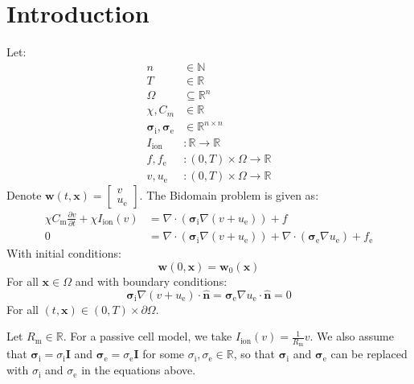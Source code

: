 \documentclass{article}
\newcommand{\bvec}[1]{\boldsymbol{#1}}
\newcommand{\brvec}[1]{\mathbf{#1}}
\newcommand{\bmat}[1]{\boldsymbol{#1}}
\newcommand{\brmat}[1]{\mathbf{#1}}
\begin{document}
\section{Introduction}

Let:
\begin{align*}
    n & \in \mathbb{N} \\
    T & \in \mathbb{R} \\
    \Omega & \subseteq \mathbb{R}^n \\
    \chi, C_m & \in \mathbb{R} \\
    \bmat{\sigma}_\text{i}, \bmat{\sigma}_\text{e} & \in \mathbb{R}^{n \times n} \\
    I_\text{ion} & : \mathbb{R} \rightarrow \mathbb{R} \\
    f, f_\text{e} & : (0, T) \times \Omega \rightarrow \mathbb{R} \\
    v, u_\text{e} & : (0, T) \times \Omega \rightarrow \mathbb{R}
\end{align*}
Denote $\bvec{w}(t, \bvec{x}) = \begin{bmatrix}
    v \\
    u_\text{e}
\end{bmatrix}$. The Bidomain problem is given as:
\begin{align} \label{eq1}
    \chi C_\text{m} \frac{\partial v}{\partial t}
        + \chi I_\text{ion}(v)
        & = \nabla \cdot (\bmat{\sigma}_\text{i} \nabla (v + u_\text{e}))
        + f \\
    \label{eq2}
    0
        & = \nabla \cdot (\bmat{\sigma}_\text{i} \nabla (v + u_\text{e}))
        + \nabla \cdot (\bmat{\sigma}_\text{e} \nabla u_\text{e})
        + f_\text{e}
\end{align}
\noindent With initial conditions:
\begin{equation}
    \bvec{w}(0, \bvec{x}) = \bvec{w}_0(\bvec{x})
\end{equation}
\noindent For all $\bvec{x} \in \Omega$ and with boundary conditions:
\begin{equation} \label{BCs}
    \bmat{\sigma}_\text{i} \nabla (v + u_\text{e}) \cdot \hat{\brvec{n}}
        = \bmat{\sigma}_\text{e} \nabla u_\text{e} \cdot \hat{\brvec{n}}
        = 0
\end{equation}
\noindent For all $(t, \bvec{x}) \in (0, T) \times \partial \Omega$.

Let $R_\text{m} \in \mathbb{R}$.
For a passive cell model, we take $I_\text{ion}(v) = \frac{1}{R_\text{m}} v$.
We also assume that $\bmat{\sigma}_\text{i} = \sigma_\text{i} \brmat{I}$
and $\bmat{\sigma}_\text{e} = \sigma_\text{e} \brmat{I}$
for some $\sigma_\text{i}, \sigma_\text{e} \in \mathbb{R}$,
so that $\bmat{\sigma}_\text{i}$ and $\bmat{\sigma}_\text{e}$
can be replaced with $\sigma_\text{i}$ and $\sigma_\text{e}$
in the equations above.
\end{document}

